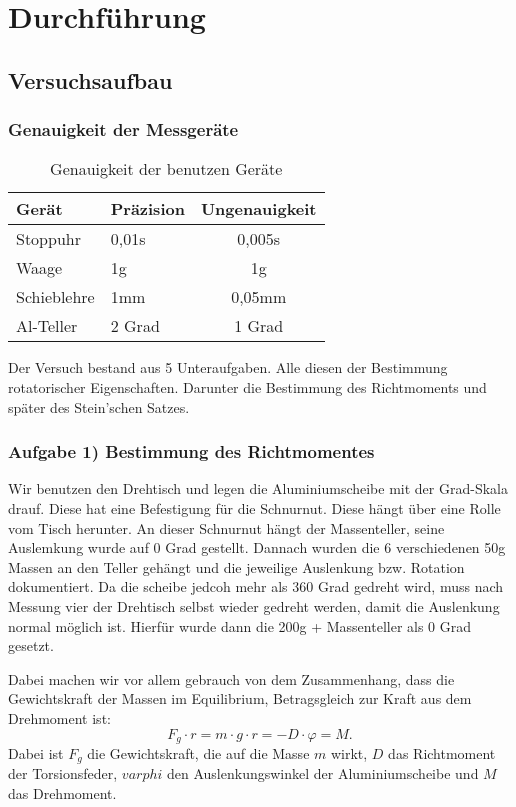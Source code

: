 \chapter{Durchführung}

\section{Versuchsaufbau}

\subsection*{Genauigkeit der Messgeräte}
\begin{table}[h!]
    \centering
    \begin{tabular}{l | l | c}
    Gerät & Präzision & Ungenauigkeit \\
    \hline
    Stoppuhr        & 0,01s     & 0,005s \\
    Waage           & 1g        & 1g \\
    Schieblehre     & 1mm       & 0,05mm \\
    Al-Teller       & 2 Grad    & 1 Grad \\
    \hline
    \end{tabular}
    \caption{Genauigkeit der benutzen Geräte \cite{Stoppuhr,Waage}}
    \label{tab:genauigkeit_der_geräte}
\end{table}

Der Versuch bestand aus 5 Unteraufgaben. Alle diesen der Bestimmung rotatorischer Eigenschaften. 
Darunter die Bestimmung des Richtmoments und später des Stein'schen Satzes.
\subsection*{Aufgabe 1) Bestimmung des Richtmomentes}
Wir benutzen den Drehtisch und legen die Aluminiumscheibe mit der Grad-Skala drauf.
Diese hat eine Befestigung für die Schnurnut. Diese hängt über eine Rolle vom Tisch herunter. 
An dieser Schnurnut hängt der Massenteller, seine Auslemkung wurde auf 0 Grad gestellt.
Dannach wurden die 6 verschiedenen 50g Massen an den Teller gehängt und die jeweilige Auslenkung bzw. Rotation dokumentiert.
Da die scheibe jedcoh mehr als 360 Grad gedreht wird, muss nach Messung vier der Drehtisch selbst wieder gedreht werden, 
damit die Auslenkung normal möglich ist. Hierfür wurde dann die 200g + Massenteller als 0 Grad gesetzt.

Dabei machen wir vor allem gebrauch von dem Zusammenhang, dass die Gewichtskraft der Massen im Equilibrium, Betragsgleich zur Kraft aus dem Drehmoment ist:
\begin{equation}
    F_g \cdot r = m \cdot g \cdot r = -D \cdot \varphi = M.
\end{equation}
\label{eq:gleichgewichts_zustand}
Dabei ist $F_g$ die Gewichtskraft, die auf die Masse $m$ wirkt, $D$ das Richtmoment der Torsionsfeder, $varphi$ den Auslenkungswinkel der Aluminiumscheibe und $M$ das Drehmoment.

